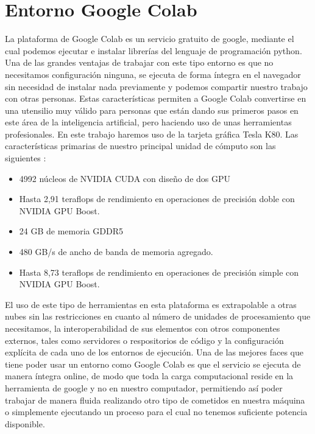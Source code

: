 \section{Entorno Google Colab}\label{sec:entorno-google-colab}
La plataforma de Google Colab es un servicio gratuito de google, mediante el cual podemos ejecutar e instalar librerías del lenguaje de programación python.
Una de las grandes ventajas de trabajar con este tipo entorno es que no necesitamos configuración ninguna, se ejecuta de forma íntegra en el navegador sin necesidad de instalar nada previamente y podemos compartir
nuestro trabajo con otras personas.
Estas características permiten a Google Colab convertirse en una utensilio muy válido para personas que están dando sus primeros pasos en este área de la inteligencia artificial, pero haciendo uso
de unas herramientas profesionales.
En este trabajo haremos uso de la tarjeta gráfica Tesla K80.
Las características primarias de nuestro principal unidad de cómputo son las siguientes :
\begin{itemize}
    \item 4992 núcleos de NVIDIA CUDA con diseño de dos GPU
    \item Hasta 2,91 teraflops de rendimiento en operaciones de precisión doble con NVIDIA GPU Boost.
    \item 24 GB de memoria GDDR5
    \item 480 GB/s de ancho de banda de memoria agregado.
    \item Hasta 8,73 teraflops de rendimiento en operaciones de precisión simple con NVIDIA GPU Boost.
\end{itemize}
El uso de este tipo de herramientas en esta plataforma es extrapolable a otras nubes sin las restricciones en cuanto al número de unidades de procesamiento que necesitamos,
la interoperabilidad de sus elementos con otros componentes externos, tales como servidores o respositorios de código y la configuración explícita de cada uno de los entornos de ejecución.
Una de las mejores faces que tiene poder usar un entorno como Google Colab es que el servicio se ejecuta de manera íntegra online, de modo que toda la carga computacional reside en la herramienta de google y no en
nuestro computador, permitiendo así poder trabajar de manera fluida realizando otro tipo de cometidos en nuestra máquina o simplemente ejecutando un proceso para el cual no tenemos suficiente potencia disponible.

